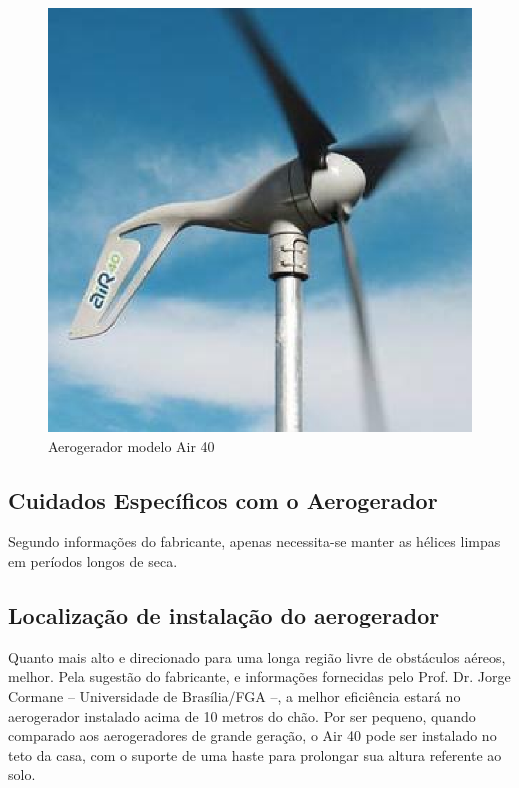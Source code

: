 \begin{figure}[H]
  \begin{center}
	\includegraphics[keepaspectratio,scale=0.5]{figuras/air_40.eps}
	\caption{Aerogerador modelo Air 40}
  \end{center}
\end{figure}


\subsection{Cuidados Específicos com o Aerogerador}

	Segundo informações do fabricante, apenas necessita-se manter as hélices limpas em períodos longos de seca. 

\subsection{Localização de instalação do aerogerador}

	Quanto mais alto e direcionado para uma longa região livre de obstáculos aéreos, melhor. Pela sugestão do fabricante, e informações fornecidas pelo Prof. Dr. Jorge Cormane -- Universidade de Brasília/FGA --, a melhor eficiência estará no aerogerador instalado acima de 10 metros do chão. Por ser pequeno, quando comparado aos aerogeradores de grande geração, o Air 40 pode ser instalado no teto da casa, com o suporte de uma haste para prolongar sua altura referente ao solo.

